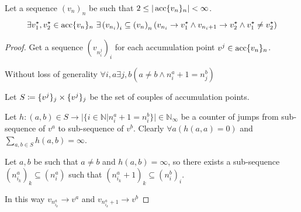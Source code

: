 \begin{lemma}
    \label{lemma:sequences}
    Let a sequence $\left(v_n\right)_n$ be such that $2 \leq |\operatorname{acc}\{v_n\}_n| < \infty$.
    \[
        \exists v_1^\star, v_2^\star \in \operatorname{acc}\{v_n\}_n \ \exists \left(v_{n_i}\right)_i\subseteq\left(v_n\right)_n\left(v_{n_i} \to v_1^\star \land v_{n_i+1} \to v_2^\star \land v_1^\star\neq v_2^\star\right)
    \]
    \begin{proof}

        \noindent Get a sequence $\left(v_{n_i^j}\right)_i$ for each accumulation point $v^j \in \operatorname{acc}\{v_n\}_n$.

        \noindent Without loss of generality $\forall i,a\exists j,b\left(a\neq b \land n_i^a+1=n_j^b\right)$

        \noindent Let $S \coloneqq \{v^j\}_j\times\{v^j\}_j$ be the set of couples of accumulation points.

        \noindent Let $h:(a,b)\in{S}\to|\{i\in\mathbb{N}|n_i^a+1=n_i^b\}|\in\mathbb{N}_\infty$ be a counter of jumps from sub-sequence of $v^a$ to sub-sequence of $v^b$. Clearly $\forall a\left(h(a,a)=0\right)$ and $\sum_{a,b\in{S}}h\left(a,b\right)=\infty$.

        \noindent Let $a,b$ be such that $a\neq b$ and $h\left(a,b\right)=\infty$, so there exists a sub-sequence $\left(n_{i_k}^a\right)_k\subseteq\left(n_i^a\right)$ such that $\left(n_{i_k}^a+1\right)_k\subseteq\left(n_i^b\right)_i$.

        \noindent In this way $v_{n_{i_k}^a} \to v^a$ and $v_{n_{i_k}^a+1} \to v^b$
    \end{proof}
\end{lemma}
